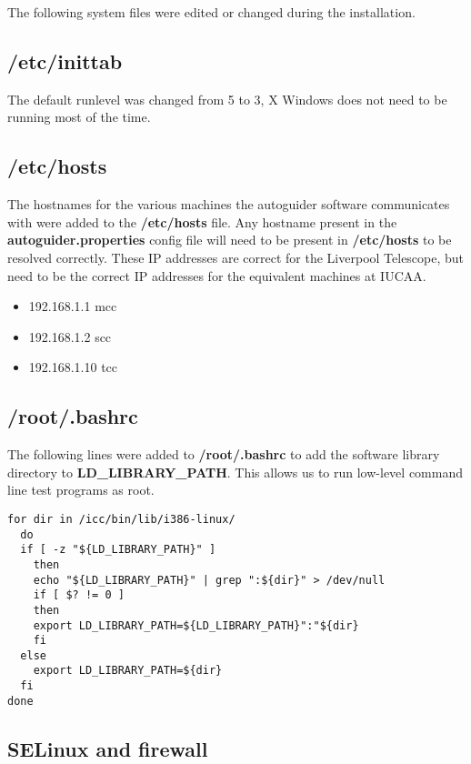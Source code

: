 \documentclass[10pt,a4paper]{article}
\begin{document}
The following system files were edited or changed during the installation.

\subsection{/etc/inittab}

The default runlevel was changed from 5 to 3, X Windows does not need to be running most of the time.

\subsection{/etc/hosts}

The hostnames for the various machines the autoguider software communicates with were added to the {\bf /etc/hosts} file. Any hostname present in the {\bf autoguider.properties} config file will need to be present in {\bf /etc/hosts} to be resolved correctly. These IP addresses are correct for the Liverpool Telescope, but need to be the correct IP addresses for the equivalent machines at IUCAA.

\begin{itemize}
\item 192.168.1.1     mcc
\item 192.168.1.2     scc
\item 192.168.1.10    tcc
\end{itemize}

\subsection{/root/.bashrc}

The following lines were added to {\bf /root/.bashrc} to add the software library directory to
{\bf LD\_LIBRARY\_PATH}. This allows us to run low-level command line test programs as root.

\begin{verbatim}
for dir in /icc/bin/lib/i386-linux/ 
  do
  if [ -z "${LD_LIBRARY_PATH}" ] 
    then
    echo "${LD_LIBRARY_PATH}" | grep ":${dir}" > /dev/null
    if [ $? != 0 ] 
    then
	export LD_LIBRARY_PATH=${LD_LIBRARY_PATH}":"${dir}
    fi
  else
    export LD_LIBRARY_PATH=${dir}
  fi
done
\end{verbatim}

\subsection{SELinux and firewall}
\end{document}
